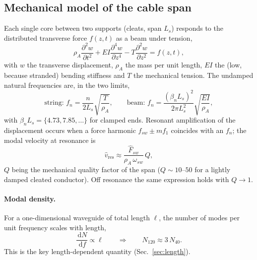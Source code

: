 \documentclass[11pt,a4paper,oneside]{book}
\newcommand{\ud}{\,\mathrm{d}}
\begin{document}
\begin{onehalfspace}
\begin{appendices}
\section{Mechanical model of the cable span}\label{sec:mech}
Each single core between two supports (cleats, span $L_s$) responds to the
distributed transverse force $f(z,t)$ as a beam under tension,
\begin{equation}
	\rho_A\frac{\partial^2 w}{\partial t^2}
	+EI\frac{\partial^4 w}{\partial z^4}
	-T\frac{\partial^2 w}{\partial z^2}
	=f(z,t),
	\label{eq:beam}
\end{equation}
with $w$ the transverse displacement, $\rho_A$ the mass per unit length, $EI$ the
(low, because stranded) bending stiffness and $T$ the mechanical tension. The
undamped natural frequencies are, in the two limits,
\begin{equation}
	\text{string: } f_n=\frac{n}{2L_s}\sqrt{\frac{T}{\rho_A}},
	\qquad
	\text{beam: } f_n=\frac{(\beta_n L_s)^2}{2\pi L_s^2}\sqrt{\frac{EI}{\rho_A}},
	\label{eq:fn}
\end{equation}
with $\beta_nL_s=\{4.73,7.85,\dots\}$ for clamped ends. Resonant amplification of
the displacement occurs when a force harmonic $f_{sw}\pm m f_1$ coincides with an
$f_n$; the modal velocity at resonance is
\begin{equation}
	\hat v_{\text{res}}\approx\frac{\hat F_{sw}}{\rho_A\,\omega_{sw}}\,Q,
	\label{eq:vres}
\end{equation}
$Q$ being the mechanical quality factor of the span ($Q\!\sim\!10$--$50$ for a
lightly damped cleated conductor). Off resonance the same expression holds with
$Q\!\to\!1$.

\paragraph{Modal density.}
For a one-dimensional waveguide of total length $\ell$, the number of modes per
unit frequency scales with length,
\begin{equation}
	\frac{\ud N}{\ud f}\propto \ell
	\qquad\Longrightarrow\qquad
	N_{120}\approx 3\,N_{40}.
	\label{eq:moddensity}
\end{equation}
This is the key length-dependent quantity (Sec.~\ref{sec:length}).


\end{appendices}
\end{onehalfspace}
\end{document}
